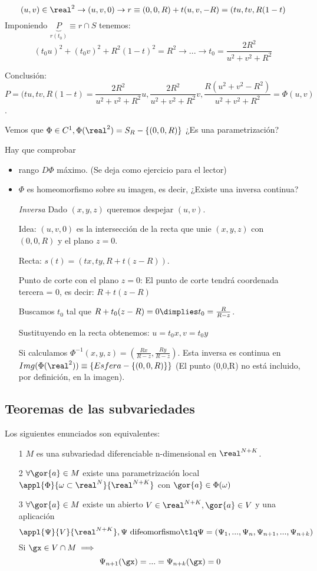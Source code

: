  \[(u,v) \in \real^2 \rightarrow (u,v,0) \rightarrow r\equiv (0,0,R) + t(u,v,-R) = (tu,tv,R(1-t)\]
 Imponiendo $\underbrace{P}_{r(t_0)} \equiv r\cap S$ tenemos: \[(t_0u)^2+(t_0v)^2 + R^2(1-t)^2 = R^2 \rightarrow ... \rightarrow t_0 = \frac{2R^2}{u^2+v^2+R^2}\]
 
 Conclusión: \[P = (tu,tv,R(1-t) = \frac{2R^2}{u^2+v^2+R^2}u,\frac{2R^2}{u^2+v^2+R^2}v,\frac{R(u^2+v^2-R^2)}{u^2+v^2+R^2} = \Phi(u,v)\].
 
 Vemos que $\Phi\in C^1, \Phi(\real^2) = S_R-\{(0,0,R)\}$ ¿Es una parametrización?
 
 Hay que comprobar \begin{itemize}
 \item rango $D\Phi$ máximo. (Se deja como ejercicio para el lector)
 \item $\Phi$ es homeomorfismo sobre su imagen, es decir, ¿Existe una inversa continua? 
 
 \emph{Inversa}
 Dado $(x,y,z)$ queremos despejar $(u,v)$.
 
 Idea: $(u,v,0)$ es la intersección de la recta que unie $(x,y,z)$ con $(0,0,R)$ y el plano $z=0$.
 
 Recta: $s(t) = (tx,ty,R+t(z-R))$.
 
 Punto de corte con el plano $z=0$: El punto de corte tendrá coordenada tercera = 0, es decir: 
 $R+t(z-R)$
 
 Buscamos $t_0$ tal que $R+t_0(z-R)=0 \dimplies t_0=\frac{R}{R-z}$.
 
 Sustituyendo en la recta obtenemos: $u = t_0x, v=t_0y$
 
 Si calculamos $\Phi^{-1}(x,y,z) = \left(\frac{Rx}{R-z},\frac{Ry}{R-z}\right)$. Esta inversa es continua en $Img(\Phi(\real^2)) \equiv \{Esfera - \{(0,0,R)\}\}$  (El punto (0,0,R) no está incluido, por definición, en la imagen).
 
 \end{itemize}
\subsection{Teoremas de las subvariedades}
\begin{theorem}
Los siguientes enunciados son equivalentes:
\begin{itemize}
\item[1] $M$ es una subvariedad diferenciable n-dimensional en $\real^{N+K}$. \label{eq_1}
\item[2] $\forall \gor{a} \in M $ existe una parametrización local $\appl{\Phi}{\omega\subset \real^N}{\real^{N+K}}$ con $\gor{a}\in \Phi(\omega)$\label{eq_2}
\item[3] $\forall \gor{a} \in M$ existe un abierto $V\in \real^{N+K}, \gor{a}\in V$ y una aplicación 
\label{eq_3}
\[\appl{\Psi}{V}{\real^{N+K}}, \Psi\ \text{difeomorfismo} \tlq \Psi = (\Psi_1,...,\Psi_n,\Psi_{n+1},...,\Psi_{n+k})\]
Si $\gx \in V\cap M \implies$
\[\Psi_{n+1}(\gx) = ... = \Psi_{n+k}(\gx) = 0\]
\end{itemize}
\end{theorem}
 
